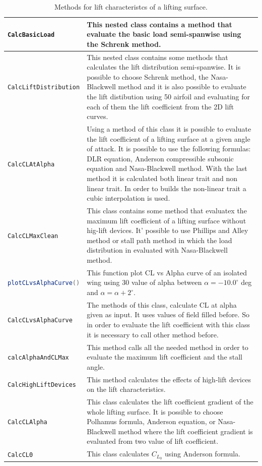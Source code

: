\begin{table}[H]
\begin{tabular}{p{7cm}p{7.5cm}}
\toprule
\lstinline[language=Java]!CalcBasicLoad! & This nested class contains a method that evaluate the basic load semi-spanwise using the Schrenk method.\\ \hline 
\lstinline[language=Java]!CalcLiftDistribution! &This nested class contains some methods that calculates the lift distribution semi-spanwise. It is possible to choose Schrenk method, the Nasa-Blackwell method and it is also possible to evaluate the lift distibution using 50 airfoil and evaluating for each of them the lift coefficient from the 2D lift curves. \\ \hline 
\lstinline[language=Java]!CalcCLAtAlpha! & Using a method of this class it is possible to evaluate the lift coefficient of a lifting surface at a given angle of attack. It is possible to use the following formulas: DLR equation, Anderson compressible subsonic equation and Nasa-Blackwell method. With the last method it is calculated both linear trait and non linear trait. In order to builds the non-linear trait a cubic interpolation is used.\\ \hline 
\lstinline[language=Java]!CalcCLMaxClean! &This class contains some method that evaluatex the maximum lift coefficient of a lifting surface without hig-lift devices. It' possible to use Phillips and Alley method or stall path method in which the load distribution in evaluated with Nasa-Blackwell method.\\ \hline 
\lstinline[language=Java]!plotCLvsAlphaCurve()! & This function plot CL vs Alpha curve of an isolated wing using 30 value of alpha between $\alpha = - 10.0^{\circ}$  deg and  $\alpha = \alpha + 2^{\circ}$.\\ \hline 
\lstinline[language=Java]!CalcCLvsAlphaCurve!&The methods of this class, calculate CL at alpha given as input. It uses values of field filled before. So in order to evaluate the lift coefficient with this class it is necessary to call other method before.\\ \hline 
\lstinline[language=Java]!calcAlphaAndCLMax! & This method calls all the needed method in order to evaluate the maximum lift coefficient and the stall angle.\\ \hline 
\lstinline[language=Java]!CalcHighLiftDevices! & This method calculates the effects of high-lift devices on the lift characteristics.\\ \hline 
\lstinline[language=Java]!CalcCLAlpha! & This class calculates the lift coefficient gradient of the whole lifting surface. It is possible to choose Polhamus formula,  Anderson equation, or Nasa-Blackwell method where the lift coefficient gradient is evaluated from two value of lift coefficient.\\ \hline 
\lstinline[language=Java]!CalcCL0! & This class calculates $C_{L_0}$ using Anderson formula.\\ \hline 
\bottomrule
\end{tabular}
\caption{Methods for lift characteristcs of a lifting surface.}
\label{table:Table2}
\end{table}

